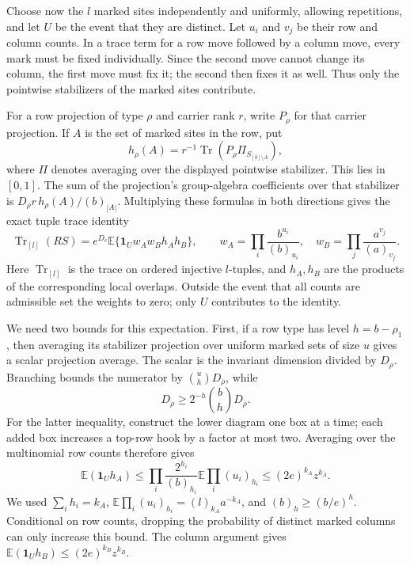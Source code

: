 Choose now the $l$ marked sites independently and uniformly, allowing
repetitions, and let $U$ be the event that they are distinct. Let
$u_i$ and $v_j$ be their row and column counts. In a trace term for
a row move followed by a column move, every mark must be fixed
individually. Since the second move cannot change its column, the
first move must fix it; the second then fixes it as well. Thus only
the pointwise stabilizers of the marked sites contribute.

For a row projection of type $\rho$ and carrier rank $r$, write
$P_\rho$ for that carrier projection. If $A$ is the set of marked
sites in the row, put
\[
 h_\rho(A)=r^{-1}\operatorname{Tr}
       (P_\rho\Pi_{S_{[b]\setminus A}}),
\]
where $\Pi$ denotes averaging over the displayed pointwise
stabilizer. This lies in $[0,1]$. The sum of the projection's
group-algebra coefficients over that stabilizer is
$D_\rho r\,h_\rho(A)/(b)_{|A|}$. Multiplying these formulas in
both directions gives the exact tuple trace identity
\[
 \operatorname{Tr}_{[l]}(RS)
 =e^{D_c}\mathbb E\{\mathbf1_Uw_Aw_Bh_Ah_B\},\qquad
 w_A=\prod_i\frac{b^{u_i}}{(b)_{u_i}},\quad
 w_B=\prod_j\frac{a^{v_j}}{(a)_{v_j}}.
\]
Here $\operatorname{Tr}_{[l]}$ is the trace on ordered injective
$l$-tuples, and $h_A,h_B$ are the products of the corresponding
local overlaps. Outside the event that all counts are admissible
set the weights to zero; only $U$ contributes to the identity.

We need two bounds for this expectation. First, if a row type has
level $h=b-\rho_1$, then averaging its stabilizer projection over
uniform marked sets of size $u$ gives a scalar projection average.
The scalar is the invariant dimension divided by $D_\rho$.
Branching bounds the numerator by
$\binom uhD_{\bar\rho}$, while
\[
 D_\rho\ge2^{-h}\binom bhD_{\bar\rho}.
\]
For the latter inequality, construct the lower diagram one box at a
time; each added box increases a top-row hook by a factor at most
two. Averaging over the multinomial row counts therefore gives
\[
 \mathbb E(\mathbf1_Uh_A)
 \le\prod_i\frac{2^{h_i}}{(b)_{h_i}}
        \mathbb E\prod_i(u_i)_{h_i}
 \le (2e)^{k_A}z^{k_A}.
\]
We used $\sum_i h_i=k_A$,
$\mathbb E\prod_i(u_i)_{h_i}=(l)_{k_A}a^{-k_A}$, and
$(b)_h\ge(b/e)^h$. Conditional on row counts, dropping the
probability of distinct marked columns can only increase this
bound. The column argument gives
$\mathbb E(\mathbf1_Uh_B)\le(2e)^{k_B}z^{k_B}$.

